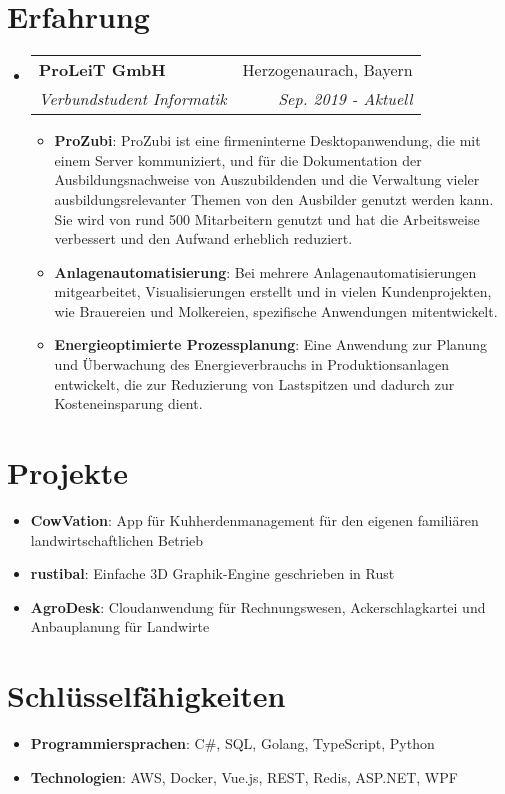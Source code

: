 \documentclass[letterpaper,11pt]{article}
\makeatletter
\newcommand{\resumeItem}[2]{
  \item\small{
    \textbf{#1}{: #2 \vspace{-2pt}}
  }
}
\newcommand{\resumeSubheading}[4]{
  \vspace{-1pt}\item
    \begin{tabular*}{0.97\textwidth}{l@{\extracolsep{\fill}}r}
      \textbf{#1} & #2 \\
      \textit{\small#3} & \textit{\small #4} \\
    \end{tabular*}\vspace{-5pt}
}
\newcommand{\resumeSubItem}[2]{\resumeItem{#1}{#2}\vspace{-4pt}}
\newcommand{\resumeSubHeadingListStart}{\begin{itemize}[leftmargin=*]}
\newcommand{\resumeSubHeadingListEnd}{\end{itemize}}
\newcommand{\resumeItemListStart}{\begin{itemize}}
\newcommand{\resumeItemListEnd}{\end{itemize}\vspace{-5pt}}
\makeatother
\begin{document}
\section{Erfahrung}
  \resumeSubHeadingListStart
    \resumeSubheading
      {ProLeiT GmbH}{Herzogenaurach, Bayern}
      {Verbundstudent Informatik}{Sep. 2019 - Aktuell}
      \resumeItemListStart
        \resumeItem{ProZubi}
          {ProZubi ist eine firmeninterne Desktopanwendung, die mit einem Server kommuniziert, und für die Dokumentation der Ausbildungsnachweise von Auszubildenden und die Verwaltung vieler ausbildungsrelevanter Themen von den Ausbilder genutzt werden kann. Sie wird von rund 500 Mitarbeitern genutzt und hat die Arbeitsweise verbessert und den Aufwand erheblich reduziert.}
        \resumeItem{Anlagenautomatisierung}
          {Bei mehrere Anlagenautomatisierungen mitgearbeitet, Visualisierungen erstellt und in vielen Kundenprojekten, wie Brauereien und Molkereien, spezifische Anwendungen mitentwickelt.}
        \resumeItem{Energieoptimierte Prozessplanung}
          {Eine Anwendung zur Planung und Überwachung des Energieverbrauchs in Produktionsanlagen entwickelt, die zur Reduzierung von Lastspitzen und dadurch zur Kosteneinsparung dient.}
      \resumeItemListEnd

  \resumeSubHeadingListEnd


\section{Projekte}
  \resumeSubHeadingListStart
    \resumeSubItem{CowVation}
      {App für Kuhherdenmanagement für den eigenen familiären landwirtschaftlichen Betrieb}
    \resumeSubItem{rustibal}
      {Einfache 3D Graphik-Engine geschrieben in Rust}
    \resumeSubItem{AgroDesk}
      {Cloudanwendung für Rechnungswesen, Ackerschlagkartei und Anbauplanung für Landwirte}
  \resumeSubHeadingListEnd

%
\section{Schlüsselfähigkeiten}
 \resumeSubHeadingListStart
    \resumeSubItem{Programmiersprachen}
      {C\#, SQL, Golang, TypeScript, Python}
    \resumeSubItem{Technologien}
      {AWS, Docker, Vue.js, REST, Redis, ASP.NET, WPF}
 \resumeSubHeadingListEnd


\end{document}
